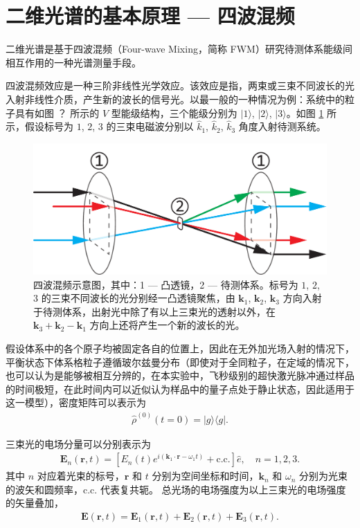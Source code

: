 \documentclass{thesis}
\begin{document}
\section{二维光谱的基本原理 --- 四波混频}
二维光谱是基于四波混频（Four-wave Mixing，简称 FWM）研究待测体系能级间相互作用的一种光谱测量手段。

四波混频效应是一种三阶非线性光学效应。该效应是指，两束或三束不同波长的光入射非线性介质，产生新的波长的信号光。以最一般的一种情况为例：系统中的粒子具有如图 ？ 所示的 $V$ 型能级结构，三个能级分别为 $\lvert 1\rangle$, $\lvert 2\rangle$, $\lvert 3\rangle$。如图 \ref{Four-wave Mixing} 所示，假设标号为 $1$, $2$, $3$ 的三束电磁波分别以 $\hat{k}_1$, $\hat{k}_2$, $\hat{k}_3$ 角度入射待测系统。

\begin{figure}[h]
    \centering
    \includegraphics[width=.5\columnwidth]{Img/Four-wave Mixing.pdf}
    \caption{四波混频示意图，其中：\textcircled{\footnotesize{1}} --- 凸透镜，\textcircled{\footnotesize{2}} --- 待测体系。标号为 $1$, $2$, $3$ 的三束不同波长的光分别经一凸透镜聚焦，由 $\bm{k}_1$, $\bm{k}_2$, $\bm{k}_3$ 方向入射于待测体系，出射光中除了有以上三束光的透射以外，在 $\bm{k}_3+\bm{k}_2-\bm{k}_1$ 方向上还将产生一个新的波长的光。}
    \label{Four-wave Mixing}
\end{figure}

假设体系中的各个原子均被固定各自的位置上，因此在无外加光场入射的情况下，平衡状态下体系格粒子遵循玻尔兹曼分布（即使对于全同粒子，在定域的情况下，也可以认为是能够被相互分辨的，在本实验中，飞秒级别的超快激光脉冲通过样品的时间极短，在此时间内可以近似认为样品中的量子点处于静止状态，因此适用于这一模型），密度矩阵可以表示为
\begin{align}
    \hat{\rho}^{(0)}(t=0)=\lvert g\rangle\langle g\rvert.
\end{align}

三束光的电场分量可以分别表示为
\begin{align}
    \bm{E}_n(\bm{r},t)=[E_n(t)e^{i(\bm{k}_1\cdot\bm{r}-\omega_1t)}+\text{c.c.}]\hat{e},\quad n=1,2,3.
\end{align}
其中 $n$ 对应着光束的标号，$\bm{r}$ 和 $t$ 分别为空间坐标和时间，$\bm{k}_n$ 和 $\omega_n$ 分别为光束的波矢和圆频率，c.c. 代表复共轭。
总光场的电场强度为以上三束光的电场强度的矢量叠加，
\begin{align}
    \bm{E}(\bm{r},t)=\bm{E}_1(\bm{r},t)+\bm{E}_2(\bm{r},t)+\bm{E}_3(\bm{r},t).
\end{align}
\end{document}
